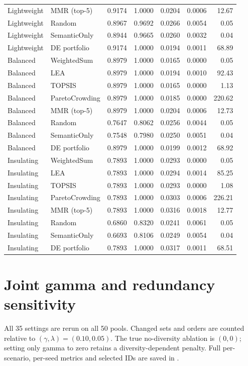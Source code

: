 \documentclass[11pt,a4paper]{article}
\begin{document}
\begin{footnotesize}
\begin{longtable}{llrrrrr}
Lightweight & MMR (top-5) & 0.9174 & 1.0000 & 0.0204 & 0.0006 & 12.67\\
Lightweight & Random & 0.8967 & 0.9692 & 0.0266 & 0.0054 & 0.05\\
Lightweight & SemanticOnly & 0.8944 & 0.9665 & 0.0260 & 0.0032 & 0.04\\
Lightweight & DE portfolio & 0.9174 & 1.0000 & 0.0194 & 0.0011 & 68.89\\
Balanced & WeightedSum & 0.8979 & 1.0000 & 0.0165 & 0.0000 & 0.05\\
Balanced & LEA & 0.8979 & 1.0000 & 0.0194 & 0.0010 & 92.43\\
Balanced & TOPSIS & 0.8979 & 1.0000 & 0.0165 & 0.0000 & 1.13\\
Balanced & ParetoCrowding & 0.8979 & 1.0000 & 0.0185 & 0.0000 & 220.62\\
Balanced & MMR (top-5) & 0.8979 & 1.0000 & 0.0204 & 0.0006 & 12.73\\
Balanced & Random & 0.7647 & 0.8062 & 0.0256 & 0.0044 & 0.05\\
Balanced & SemanticOnly & 0.7548 & 0.7980 & 0.0250 & 0.0051 & 0.04\\
Balanced & DE portfolio & 0.8979 & 1.0000 & 0.0199 & 0.0012 & 68.92\\
Insulating & WeightedSum & 0.7893 & 1.0000 & 0.0293 & 0.0000 & 0.05\\
Insulating & LEA & 0.7893 & 1.0000 & 0.0294 & 0.0014 & 85.25\\
Insulating & TOPSIS & 0.7893 & 1.0000 & 0.0293 & 0.0000 & 1.08\\
Insulating & ParetoCrowding & 0.7893 & 1.0000 & 0.0303 & 0.0006 & 226.21\\
Insulating & MMR (top-5) & 0.7893 & 1.0000 & 0.0316 & 0.0018 & 12.77\\
Insulating & Random & 0.6860 & 0.8320 & 0.0241 & 0.0061 & 0.05\\
Insulating & SemanticOnly & 0.6693 & 0.8106 & 0.0249 & 0.0054 & 0.04\\
Insulating & DE portfolio & 0.7893 & 1.0000 & 0.0317 & 0.0011 & 68.51\\
\bottomrule\end{longtable}\end{footnotesize}
\section*{Joint gamma and redundancy sensitivity}
All 35 settings are rerun on all 50 pools. Changed sets and orders are counted relative to $(\gamma,\lambda)=(0.10,0.05)$. The true no-diversity ablation is $(0,0)$; setting only gamma to zero retains a diversity-dependent penalty. Full per-scenario, per-seed metrics and selected IDs are saved in .
\end{document}
